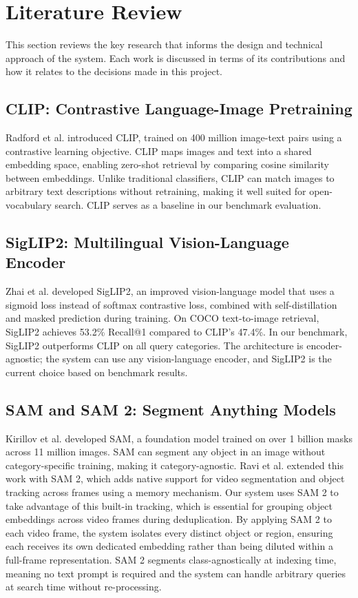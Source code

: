 \section{Literature Review}
\label{section:literature-review}

This section reviews the key research that informs the design and technical approach of the system. Each work is discussed in terms of its contributions and how it relates to the decisions made in this project.

\subsection{CLIP: Contrastive Language-Image Pretraining}

Radford et al. \cite{radford2021learning} introduced CLIP, trained on 400 million image-text pairs using a contrastive learning objective. CLIP maps images and text into a shared embedding space, enabling zero-shot retrieval by comparing cosine similarity between embeddings. Unlike traditional classifiers, CLIP can match images to arbitrary text descriptions without retraining, making it well suited for open-vocabulary search. CLIP serves as a baseline in our benchmark evaluation.

\subsection{SigLIP2: Multilingual Vision-Language Encoder}

Zhai et al. \cite{zhai2025siglip2} developed SigLIP2, an improved vision-language model that uses a sigmoid loss instead of softmax contrastive loss, combined with self-distillation and masked prediction during training. On COCO text-to-image retrieval, SigLIP2 achieves 53.2\% Recall@1 compared to CLIP's 47.4\%. In our benchmark, SigLIP2 outperforms CLIP on all query categories. The architecture is encoder-agnostic; the system can use any vision-language encoder, and SigLIP2 is the current choice based on benchmark results.

\subsection{SAM and SAM 2: Segment Anything Models}

Kirillov et al. \cite{kirillov2023segment} developed SAM, a foundation model trained on over 1 billion masks across 11 million images. SAM can segment any object in an image without category-specific training, making it category-agnostic. Ravi et al. \cite{ravi2024sam2} extended this work with SAM 2, which adds native support for video segmentation and object tracking across frames using a memory mechanism. Our system uses SAM 2 to take advantage of this built-in tracking, which is essential for grouping object embeddings across video frames during deduplication. By applying SAM 2 to each video frame, the system isolates every distinct object or region, ensuring each receives its own dedicated embedding rather than being diluted within a full-frame representation. SAM 2 segments class-agnostically at indexing time, meaning no text prompt is required and the system can handle arbitrary queries at search time without re-processing.

